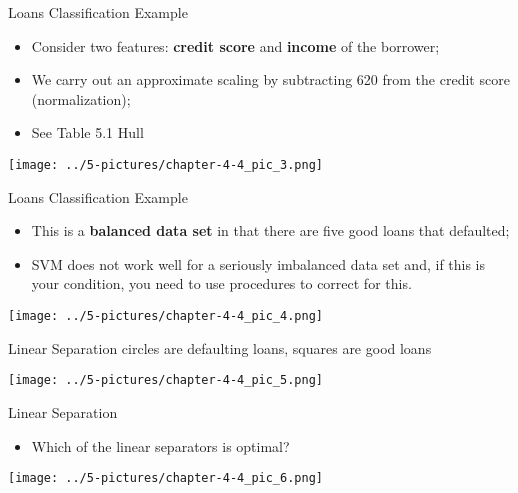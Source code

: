 \documentclass[11pt]{beamer}
\begin{document}
\begin{frame}{Loans Classification Example}
	\begin{itemize}
		\item Consider two features: \textbf{credit score} and \textbf{income} of the borrower;
		\item We carry out an approximate scaling by subtracting 620 from the credit score (normalization);
		\item See Table 5.1 Hull
	\end{itemize}
	\begin{center}
	\texttt{[image: ../5-pictures/chapter-4-4\_pic\_3.png]}
	\end{center}
\end{frame}
\begin{frame}{Loans Classification Example}
	\begin{itemize}
		\item This is a \textbf{balanced data set} in that there are five good loans that defaulted;
		\item SVM does not work well for a seriously imbalanced data set and, if this is your condition, you need to use procedures to correct for this. 
	\end{itemize}
	\begin{center}
	\texttt{[image: ../5-pictures/chapter-4-4\_pic\_4.png]}
	\end{center}
\end{frame}
\begin{frame}{Linear Separation}
	circles are defaulting loans, squares are good loans
	\begin{center}
	\texttt{[image: ../5-pictures/chapter-4-4\_pic\_5.png]}
	\end{center}
\end{frame}
\begin{frame}{Linear Separation}
	\begin{itemize}
		\item Which of the linear separators is optimal? 
	\end{itemize}
	\begin{center}
	\texttt{[image: ../5-pictures/chapter-4-4\_pic\_6.png]}
	\end{center}
\end{frame}
\end{document}
